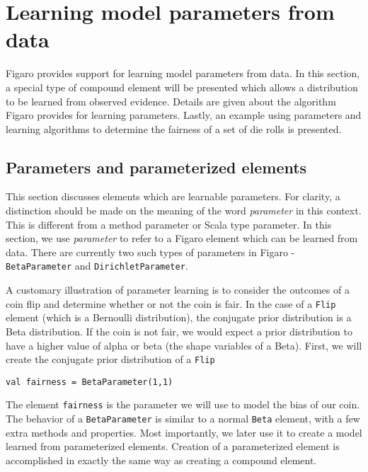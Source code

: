 
\chapter{Learning model parameters from data} %

\label{Learning model parameters from data} %

Figaro provides support for learning model parameters from data. In this section, a special type of compound element will be presented which allows a distribution to be learned from observed evidence. Details are given about the algorithm Figaro provides for learning parameters. Lastly, an example using parameters and learning algorithms to determine the fairness of a set of die rolls is presented.

\section{Parameters and parameterized elements}

This section discusses elements which are learnable parameters. For clarity, a distinction should be made on the meaning of the word \emph{parameter} in this context. This is different from a method parameter or Scala type parameter. In this section, we use \emph{parameter} to refer to a Figaro element which can be learned from data. There are currently two such types of parameters in Figaro - \texttt{BetaParameter} and \texttt{DirichletParameter}.

A customary illustration of parameter learning is to consider the outcomes of a coin flip and determine whether or not the coin is fair. In the case of a \texttt{Flip} element (which is a Bernoulli distribution), the conjugate prior distribution is a Beta distribution. If the coin is not fair, we would expect a prior distribution to have a higher value of alpha or beta (the shape variables of a Beta). First, we will create the conjugate prior distribution of a \texttt{Flip}

\begin{flushleft}
\texttt{val fairness = BetaParameter(1,1)}
\end{flushleft}

The element \texttt{fairness} is the parameter we will use to model the bias of our coin. The behavior of a \texttt{BetaParameter} is similar to a normal \texttt{Beta} element, with a few extra methods and properties. Most importantly, we later use it to create a model learned from parameterized elements. Creation of a parameterized element is accomplished in exactly the same way as creating a compound element.

